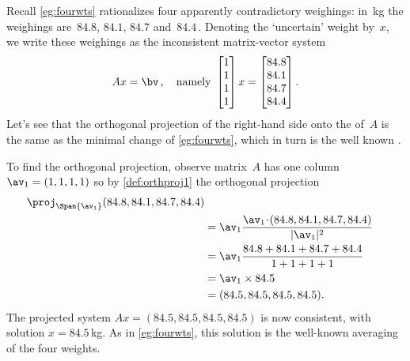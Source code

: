 \begin{example} \label{eg:fourwts2}
Recall \autoref{eg:fourwts} rationalizes four apparently contradictory weighings: in~kg the weighings are~\(84.8\), \(84.1\), \(84.7\) and~\(84.4\)\,.
Denoting the `uncertain' weight by~\(x\),  we write these weighings as the inconsistent matrix-vector system
\begin{equation*}
Ax=\bv\,,\quad\text{namely }
\begin{bmatrix} 1\\1\\1\\1 \end{bmatrix}x
=\begin{bmatrix} 84.8\\84.1\\84.7\\84.4 \end{bmatrix}.
\end{equation*}
Let's see that the orthogonal projection of the right-hand side onto the  of~\(A\) is the same as the minimal change of \autoref{eg:fourwts}, which in turn is the well known .

To find the orthogonal projection, observe matrix~\(A\) has one column \(\av_1=(1,1,1,1)\) so by \autoref{def:orthproj1} the orthogonal projection
\begin{align*}
\proj_{\Span\{\av_1\}}(84.8,84.1,84.7,84.4)
\\&=\av_1\frac{\av_1\cdot(84.8,84.1,84.7,84.4)}{|\av_1|^2}
\\&=\av_1\frac{84.8+84.1+84.7+84.4}{1+1+1+1}
\\&=\av_1\times 84.5
\\&=(84.5,84.5,84.5,84.5).
\end{align*}
The projected system \(Ax=(84.5,84.5,84.5,84.5)\) is now consistent, with solution \(x=84.5\)\,kg.
As in \autoref{eg:fourwts}, this solution is the well-known averaging of the four weights.
\end{example}


